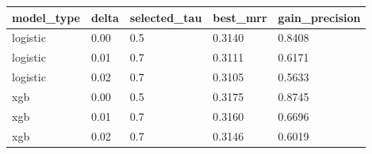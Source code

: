 \begin{tabular}{lllll}
\toprule
model_type & delta & selected_tau & best_mrr & gain_precision \\
\midrule
logistic & 0.00 & 0.5 & 0.3140 & 0.8408 \\
logistic & 0.01 & 0.7 & 0.3111 & 0.6171 \\
logistic & 0.02 & 0.7 & 0.3105 & 0.5633 \\
xgb & 0.00 & 0.5 & 0.3175 & 0.8745 \\
xgb & 0.01 & 0.7 & 0.3160 & 0.6696 \\
xgb & 0.02 & 0.7 & 0.3146 & 0.6019 \\
\bottomrule
\end{tabular}
